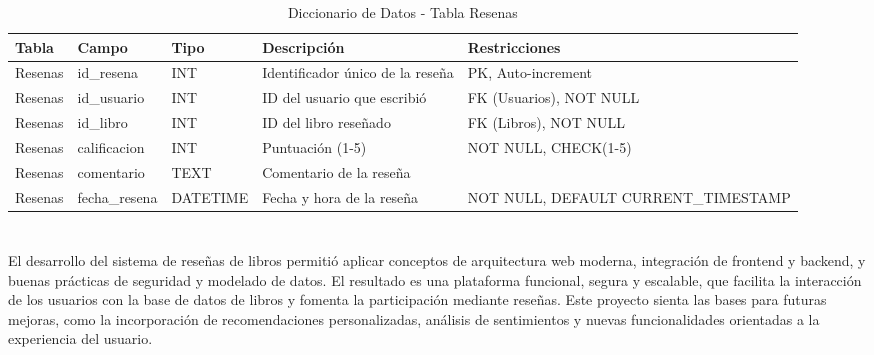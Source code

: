 \documentclass[10pt,a4paper]{article}
\begin{document}
\begin{table}[H]
	\centering
	\hspace*{0pt}
	\begin{tabular}{p{2cm}|p{2.5cm}|>{\raggedright\arraybackslash}p{3cm}|p{4cm}|p{2.5cm}}
		\hline \hline
		\textbf{Tabla} & \textbf{Campo} & \textbf{Tipo} & \textbf{Descripción} & \textbf{Restricciones} \\ \hline \hline
		Resenas & id\_resena & INT & Identificador único de la reseña & PK, Auto-increment \\ \hline
		Resenas & id\_usuario & INT & ID del usuario que escribió & FK (Usuarios), NOT NULL \\ \hline
		Resenas & id\_libro & INT & ID del libro reseñado & FK (Libros), NOT NULL \\ \hline
		Resenas & calificacion & INT & Puntuación (1-5) & NOT NULL, CHECK(1-5) \\ \hline
		Resenas & comentario & TEXT & Comentario de la reseña & \\ \hline
		Resenas & fecha\_resena & DATETIME & Fecha y hora de la reseña & NOT NULL, DEFAULT CURRENT\_TIMESTAMP \\ \hline
	\end{tabular}
	\caption{Diccionario de Datos - Tabla Resenas}
	\label{tab:diccionario_resenas}
\end{table}

\section{\color{colorIPN}{Conclusión Final}}
El desarrollo del sistema de reseñas de libros permitió aplicar conceptos de arquitectura web moderna, integración de frontend y backend, y buenas prácticas de seguridad y modelado de datos. El resultado es una plataforma funcional, segura y escalable, que facilita la interacción de los usuarios con la base de datos de libros y fomenta la participación mediante reseñas. Este proyecto sienta las bases para futuras mejoras, como la incorporación de recomendaciones personalizadas, análisis de sentimientos y nuevas funcionalidades orientadas a la experiencia del usuario.
\end{document}

